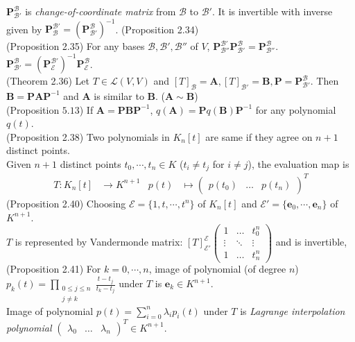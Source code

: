 \documentclass{article}
\theoremstyle{definition}
\begin{document}
$\mathbf{P}_{\mathcal{B}'}^{\mathcal{B}}$ is \textit{change-of-coordinate matrix} from $\mathcal{B}$ to $\mathcal{B}'$. It is invertible with inverse given by $\mathbf{P}_{\mathcal{B}}^{\mathcal{B}'}=(\mathbf{P}_{\mathcal{B}'}^{\mathcal{B}})^{-1}$. (Proposition 2.34)\\
(Proposition 2.35) For any bases $\mathcal{B},\mathcal{B}',\mathcal{B}''$ of $V$, $\mathbf{P}_{\mathcal{B}''}^{\mathcal{B}'}\mathbf{P}_{\mathcal{B}'}^{\mathcal{B}}=\mathbf{P}_{\mathcal{B}''}^{\mathcal{B}}$. $\mathbf{P}_{\mathcal{B}'}^{\mathcal{B}}=(\mathbf{P}_{\mathcal{E}}^{\mathcal{B}'})^{-1}\mathbf{P}_{\mathcal{E}}^{\mathcal{B}}$.\\
(Theorem 2.36) Let $T\in\mathscr{L}(V,V)$ and $\left[T\right]_{\mathcal{B}}=\mathbf{A},\left[T\right]_{\mathcal{B}'}=\mathbf{B},\mathbf{P}=\mathbf{P}_{\mathcal{B}'}^{\mathcal{B}}$. Then $\mathbf{B}=\mathbf{PAP}^{-1}$ and $\mathbf{A}$ is similar to $\mathbf{B}$. ($\mathbf{A}\sim\mathbf{B}$)\\
(Proposition $5.13$) If $\mathbf{A}=\mathbf{PBP}^{-1}$, $q(\mathbf{A})=\mathbf{P}q(\mathbf{B})\mathbf{P}^{-1}$ for any polynomial $q(t)$.\\
(Proposition 2.38) Two polynomials in $K_{n}\left[t\right]$ are same if they agree on $n+1$ distinct points.\\
Given $n+1$ distinct points $t_{0},\cdots,t_{n}\in K$ ($t_{i}\neq t_{j}$ for $i\neq j$), the evaluation map is
\begin{align*}
    T:K_{n}\left[t\right]&\rightarrow K^{n+1} & p(t)&\mapsto\begin{pmatrix}
        p(t_{0})& \hdots & p(t_{n})
    \end{pmatrix}^{T}
\end{align*}
(Proposition 2.40) Choosing $\mathcal{E}=\{1,t,\cdots,t^{n}\}$ of $K_{n}\left[t\right]$ and $\mathcal{E}'=\{\mathbf{e}_{0},\cdots,\mathbf{e}_{n}\}$ of $K^{n+1}$.\\
$T$ is represented by Vandermonde matrix: $\left[T\right]_{\mathcal{E}'}^{\mathcal{E}}\begin{pmatrix}
    1 & \hdots & t_{0}^{n}\\
    \vdots & \ddots & \vdots\\
    1 & \hdots & t_{n}^{n}
\end{pmatrix}$ and is invertible, \\
(Proposition 2.41) For $k=0,\cdots,n$, image of polynomial (of degree $n$) $p_{k}(t)=\prod_{\substack{0\leq j\leq n\\j\neq k}}\frac{t-t_{j}}{t_{k}-t_{j}}$ under $T$ is $\mathbf{e}_{k}\in K^{n+1}$.\\
Image of polynomial $p(t)=\sum_{i=0}^{n}\lambda_{i}p_{i}(t)$ under $T$ is \textit{Lagrange interpolation polynomial} $\begin{pmatrix}
    \lambda_{0} & \hdots & \lambda_{n}
\end{pmatrix}^{T}\in K^{n+1}$.
\newpage
\end{document}
